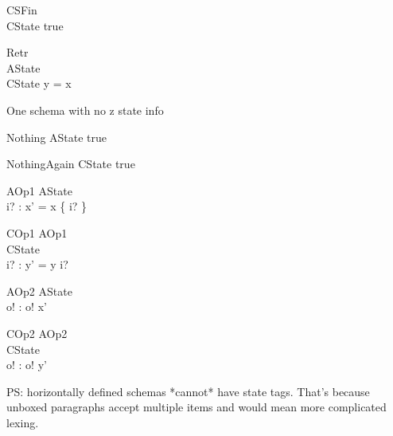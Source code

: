  

\begin{schema}{CSFin}
\zcstfin\\
 CState 
\where
 true
\end{schema}

 

\begin{schema}{Retr}
\zretrieve\\
 AState \\
 CState 
\where
 \ran y = x
\end{schema}

 

One schema with no z state info
\begin{schema}{Nothing}
\Delta AState 
\where
 true
\end{schema}

 

\begin{schema}{NothingAgain}
\Delta CState 
\where
 true
\end{schema}

 

\begin{schema}{AOp1}
\Delta AState \\
 i? : \nat 
\where
 x' = x \cup \{ i? \}
\end{schema}

 

\begin{schema}{COp1}
\zfsrefines AOp1\\
 \Delta CState \\
 i? : \nat 
\where
 y' = y \cat \langle i? \rangle
\end{schema}

 

\begin{schema}{AOp2}
\Xi AState \\
 o! : \nat 
\where
 o! \in x'
\end{schema}

 

\begin{schema}{COp2}
\zbsrefines AOp2\\
 \Xi CState \\
 o! : \nat 
\where
 o! \in \ran y'
\end{schema}

 

PS: horizontally defined schemas *cannot* have state tags. That's because
unboxed paragraphs accept multiple items and would mean more complicated lexing.


